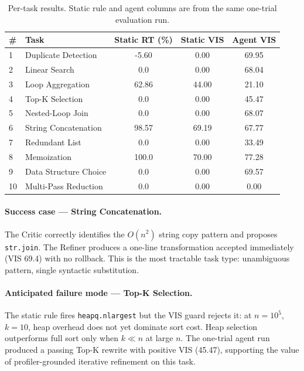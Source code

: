 \documentclass{article}
\begin{document}
\begin{table}[h]
\centering
\caption{Per-task results. Static rule and agent columns are from the same one-trial evaluation run.}
\label{tab:pertask}
\small
\begin{tabular}{llccc}
\toprule
\textbf{\#} & \textbf{Task} & \textbf{Static RT (\%)} & \textbf{Static VIS} & \textbf{Agent VIS} \\
\midrule
1  & Duplicate Detection   & -5.60 & 0.00  & 69.95 \\
2  & Linear Search         & 0.0   & 0.00  & 68.04 \\
3  & Loop Aggregation      & 62.86 & 44.00 & 21.10 \\
4  & Top-K Selection       & 0.0   & 0.00  & 45.47 \\
5  & Nested-Loop Join      & 0.0   & 0.00  & 68.07 \\
6  & String Concatenation  & 98.57 & 69.19 & 67.77 \\
7  & Redundant List        & 0.0   & 0.00  & 33.49 \\
8  & Memoization           & 100.0 & 70.00 & 77.28 \\
9  & Data Structure Choice & 0.0   & 0.00  & 69.57 \\
10 & Multi-Pass Reduction  & 0.0   & 0.00  & 0.00 \\
\bottomrule
\end{tabular}
\end{table}

\paragraph{Success case --- String Concatenation.}
The Critic correctly identifies the $O(n^2)$ string copy pattern and proposes \texttt{str.join}. The Refiner produces a one-line transformation accepted immediately (VIS 69.4) with no rollback. This is the most tractable task type: unambiguous pattern, single syntactic substitution.

\paragraph{Anticipated failure mode --- Top-K Selection.}
The static rule fires \texttt{heapq.nlargest} but the VIS guard rejects it: at $n=10^5$, $k=10$, heap overhead does not yet dominate sort cost. Heap selection outperforms full sort only when $k \ll n$ at large $n$. The one-trial agent run produced a passing Top-K rewrite with positive VIS (45.47), supporting the value of profiler-grounded iterative refinement on this task.
\end{document}

